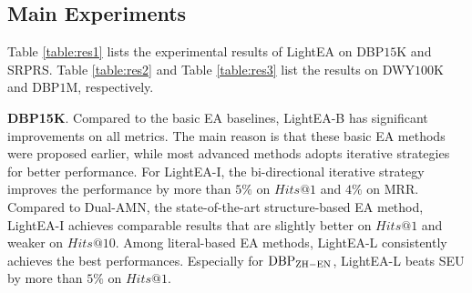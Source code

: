 \documentclass[11pt]{article}
\begin{document}
\begin{table}[t]
\caption{Experimental results on DBP$1$M\protect\footnotemark.}
\label{table:res3}
\end{table}

\subsection{Main Experiments}
Table \ref{table:res1} lists the experimental results of LightEA on DBP$15$K and SRPRS.
Table \ref{table:res2} and Table \ref{table:res3} list the results on DWY$100$K and DBP$1$M, respectively.

\noindent
\textbf{DBP15K}.
Compared to the basic EA baselines, LightEA-B has significant improvements on all metrics.
The main reason is that these basic EA methods were proposed earlier, while most advanced methods adopts iterative strategies for better performance.
For LightEA-I, the bi-directional iterative strategy improves the performance by more than $5\%$ on $Hits@1$ and $4\%$ on MRR.
Compared to Dual-AMN, the state-of-the-art structure-based EA method, LightEA-I achieves comparable results that are slightly better on $Hits@1$ and weaker on $Hits@10$.
Among literal-based EA methods, LightEA-L consistently achieves the best performances.
Especially for $\rm DBP_{ZH-EN}$, LightEA-L beats SEU by more than $5\%$ on $Hits@1$.
\end{document}
